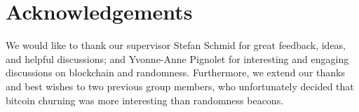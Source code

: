 \section{Acknowledgements}\label{sec:acknowledgements}
We would like to thank our supervisor Stefan Schmid for great feedback, ideas, and helpful discussions; and Yvonne-Anne Pignolet for interesting and engaging discussions on blockchain and randomness.
Furthermore, we extend our thanks and best wishes to two previous group members, who unfortunately decided that bitcoin churning was more interesting than randomness beacons.
